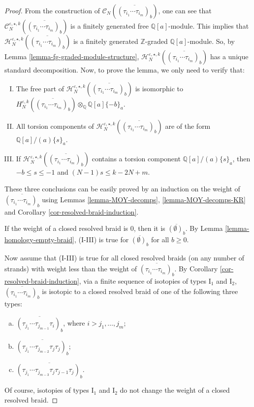 \documentclass{amsart}
\theoremstyle{plain}
\theoremstyle{definition}
\theoremstyle{remark}
\numberwithin{equation}{section}
\begin{document}
\begin{proof}
From the construction of ${\mathcal{C}}_N(\overline{(\tau_{i_1}\cdots\tau_{i_m})_b})$, one can see that ${\mathcal{C}}_N^{{\varepsilon},\star,k}(\overline{(\tau_{i_1}\cdots\tau_{i_m})_b})$ is a finitely generated free ${\mathbb{Q}}[a]$-module. This implies that ${\mathcal{H}}_N^{{\varepsilon},\star,k}(\overline{(\tau_{i_1}\cdots\tau_{i_m})_b})$ is a finitely generated ${\mathbb{Z}}$-graded ${\mathbb{Q}}[a]$-module. So, by Lemma \ref{lemma-fg-graded-module-structure}, ${\mathcal{H}}_N^{{\varepsilon},\star,k}(\overline{(\tau_{i_1}\cdots\tau_{i_m})_b})$ has a unique standard decomposition. Now, to prove the lemma, we only need to verify that:
\begin{enumerate}[(I)]
	\item The free part of ${\mathcal{H}}_N^{{\varepsilon},\star,k}(\overline{(\tau_{i_1}\cdots\tau_{i_m})_b})$ is isomorphic to $H_N^{{\varepsilon},k}(\overline{(\tau_{i_1}\cdots\tau_{i_m})_b}) \otimes_{\mathbb{Q}} {\mathbb{Q}}[a]\{-b\}_a$.
	\item All torsion components of ${\mathcal{H}}_N^{{\varepsilon},\star,k}(\overline{(\tau_{i_1}\cdots\tau_{i_m})_b})$ are of the form ${\mathbb{Q}}[a]/(a)\{s\}_a$.
	\item If ${\mathcal{H}}_N^{{\varepsilon},\star,k}(\overline{(\tau_{i_1}\cdots\tau_{i_m})_b})$ contains a torsion component ${\mathbb{Q}}[a]/(a)\{s\}_a$, then $-b \leq s \leq -1$ and $(N-1)s \leq k -2N+m$.
\end{enumerate}

These three conclusions can be easily proved by an induction on the weight of $\overline{(\tau_{i_1}\cdots\tau_{i_m})_b}$ using Lemmas \ref{lemma-MOY-decomps}, \ref{lemma-MOY-decomps-KR} and Corollary \ref{cor-resolved-braid-induction}. 

If the weight of a closed resolved braid is $0$, then it is $\overline{(\emptyset)_b}$. By Lemma \ref{lemma-homology-empty-braid}, (I-III) is true for $\overline{(\emptyset)_b}$ for all $b\geq 0$.

Now assume that (I-III) is true for all closed resolved braids (on any number of strands) with weight less than the weight of $\overline{(\tau_{i_1}\cdots\tau_{i_m})_b}$. By Corollary \ref{cor-resolved-braid-induction}, via a finite sequence of isotopies of types I$_1$ and I$_2$, $\overline{(\tau_{i_1}\cdots\tau_{i_m})_b}$ is isotopic to a closed resolved braid of one of the following three types:
\begin{enumerate}[(a)]
	\item $\overline{(\tau_{j_1}\cdots\tau_{j_{m-1}}\tau_i)_b}$, where $i>j_1,\dots,j_m$;
	\item $\overline{(\tau_{j_1}\cdots\tau_{j_{m-2}}\tau_j\tau_j)_b}$;
	\item $\overline{(\tau_{j_1}\cdots\tau_{j_{m-3}}\tau_j\tau_{j-1}\tau_j)_b}$.
\end{enumerate}
Of course, isotopies of types I$_1$ and I$_2$ do not change the weight of a closed resolved braid.


\end{proof}
\end{document}
